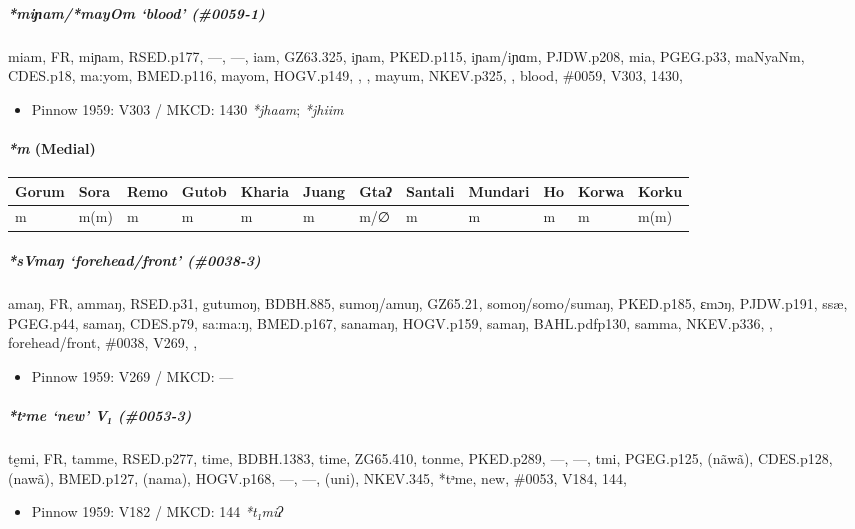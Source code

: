 \documentclass[a4paper,]{article}
\providecommand{\tightlist}{%
  \setlength{\itemsep}{0pt}\setlength{\parskip}{0pt}}
\let\oldparagraph\paragraph
\renewcommand{\paragraph}[1]{\oldparagraph{#1}\mbox{}}
\let\oldsubparagraph\subparagraph
\renewcommand{\subparagraph}[1]{\oldsubparagraph{#1}\mbox{}}
\begin{document}
\subparagraph{\texorpdfstring{\emph{*miɲam}/\emph{*mayOm} `blood'
(\#0059-1)}{*miɲam/*mayOm blood (\#0059-1)}}\label{miux272ammayom-blood-0059-1}

miam, FR, miɲam, RSED.p177, ---, ---, iam, GZ63.325, iɲam, PKED.p115,
iɲam/iɲɑm, PJDW.p208, mia, PGEG.p33, maNyaNm, CDES.p18, ma:yom,
BMED.p116, mayom, HOGV.p149, , , mayum, NKEV.p325, , blood, \#0059,
V303, 1430,

\begin{itemize}
\tightlist
\item
  Pinnow 1959: V303 / MKCD: 1430 \emph{*jhaam}; \emph{*jhiim}
\end{itemize}

\paragraph{\texorpdfstring{\emph{*m}
(Medial)}{*m (Medial)}}\label{m-medial}

\begin{longtable}[]{@{}llllllllllll@{}}
\toprule
Gorum & Sora & Remo & Gutob & Kharia & Juang & Gtaʔ & Santali & Mundari
& Ho & Korwa & Korku\tabularnewline
\midrule
\endhead
m & m(m) & m & m & m & m & m/∅ & m & m & m & m & m(m)\tabularnewline
\bottomrule
\end{longtable}

\subparagraph{\texorpdfstring{\emph{*sVmaŋ} `forehead/front'
(\#0038-3)}{*sVmaŋ forehead/front (\#0038-3)}}\label{svmaux14b-foreheadfront-0038-3}

amaŋ, FR, ammaŋ, RSED.p31, gutumoŋ, BDBH.885, sumoŋ/amuŋ, GZ65.21,
somoŋ/somo/sumaŋ, PKED.p185, ɛmɔŋ, PJDW.p191, ssæ, PGEG.p44, samaŋ,
CDES.p79, sa:ma:ŋ, BMED.p167, sanamaŋ, HOGV.p159, samaŋ, BAHL.pdfp130,
samma, NKEV.p336, , forehead/front, \#0038, V269, ,

\begin{itemize}
\tightlist
\item
  Pinnow 1959: V269 / MKCD: ---
\end{itemize}

\subparagraph{\texorpdfstring{\emph{*tᵊme} `new' V₁
(\#0053-3)}{*tᵊme new V₁ (\#0053-3)}}\label{tux1d4ame-new-v-0053-3}

tḛmi, FR, tamme, RSED.p277, time, BDBH.1383, time, ZG65.410, tonme,
PKED.p289, ---, ---, tmi, PGEG.p125, (nãwã), CDES.p128, (nawã),
BMED.p127, (nama), HOGV.p168, ---, ---, (uni), NKEV.345, *tᵊme, new,
\#0053, V184, 144,

\begin{itemize}
\tightlist
\item
  Pinnow 1959: V182 / MKCD: 144 \emph{*t₁miʔ}
\end{itemize}
\end{document}
